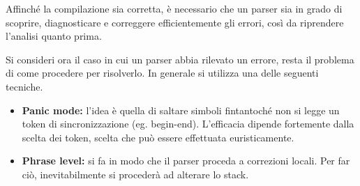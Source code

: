 \documentclass{subfiles}
\begin{document}
Affinché la compilazione sia corretta, è necessario che un parser sia in grado di scoprire, diagnosticare e correggere efficientemente gli errori,
così da riprendere l'analisi quanto prima.

Si consideri ora il caso in cui un parser abbia rilevato un errore, resta il problema di come procedere per risolverlo.
In generale si utilizza una delle seguenti tecniche.
\begin{itemize}
    \item \textbf{Panic mode:} l'idea è quella di saltare simboli fintantoché non si legge un token di sincronizzazione (eg. begin-end).
          L'efficacia dipende fortemente dalla scelta dei token, scelta che può essere effettuata euristicamente.

    \item \textbf{Phrase level:} si fa in modo che il parser proceda a correzioni locali.
          Per far ciò, inevitabilmente si procederà ad alterare lo stack.
\end{itemize}
\end{document}
